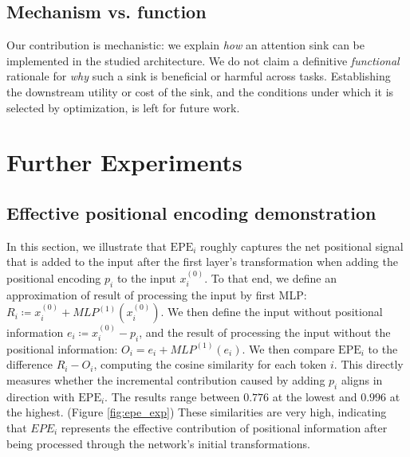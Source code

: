 \documentclass[11pt]{article}
\begin{document}
\subsection{Mechanism vs. function}
Our contribution is mechanistic: we explain \emph{how} an attention sink can be implemented in the studied architecture. We do not claim a definitive \emph{functional} rationale for \emph{why} such a sink is beneficial or harmful across tasks. Establishing the downstream utility or cost of the sink, and the conditions under which it is selected by optimization, is left for future work.




\appendix

\section{Further Experiments}

\subsection{Effective positional encoding demonstration} \label{app:epe_exp}
In this section, we illustrate that $\mathrm{EPE}_i$ roughly captures the net positional signal that is added to the input after the first layer’s transformation when adding the positional encoding $p_i$ to the input $x_i^{(0)}$. To that end, we define an approximation of result of processing the input by first MLP: $R_i \coloneq x_i^{(0)} + MLP^{(1)}(x_i^{(0)})$. We then define the input without positional information $e_i \coloneq x_i^{(0)}-p_i$, and the result of processing the input without the positional information: $O_i=e_i + MLP^{(1)}(e_i)$.  We then compare \(\mathrm{EPE}_i\) to the difference \(R_i - O_i\), computing the cosine similarity for each token \(i\). This directly measures whether the incremental contribution caused by adding \(p_i\) aligns in direction with \(\mathrm{EPE}_i\). The results range between $0.776$ at the lowest and $0.996$ at the highest. (Figure \ref{fig:epe_exp}) These similarities are very high, indicating that $EPE_i$ represents the effective contribution of positional information after being processed through the network’s initial transformations.
\end{document}
